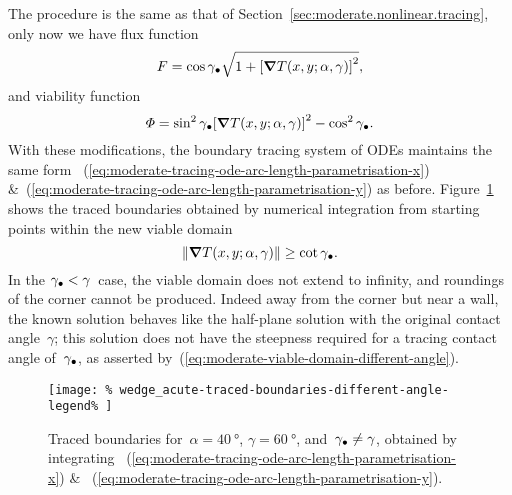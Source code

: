 The procedure is the same
as that of Section~\ref{sec:moderate.nonlinear.tracing},
only now we have flux function
\begin{equation}
  F =
    \cos\gamma_\tr
    \sqrt{1 + \squarebr[\bulkysize]{\del T (x, y; \alpha, \gamma)}^2},
  \label{eq:moderate-flux-function-different-angle}
\end{equation}
and viability function
\begin{equation}
  \Phi =
    \sin^2\gamma_\tr \squarebr[\bulkysize]{\del T (x, y; \alpha, \gamma)}^2
    - \cos^2\gamma_\tr.
    \label{eq:moderate-viability-function-different-angle}
\end{equation}
With these modifications,
the boundary tracing system of ODEs maintains the same form~%
  (\ref{eq:moderate-tracing-ode-arc-length-parametrisation-x})
\&~(\ref{eq:moderate-tracing-ode-arc-length-parametrisation-y})
as before.
Figure~\ref{fig:wedge_acute-traced-boundaries-different-angle}
shows the traced boundaries obtained by numerical integration
from starting points within the new viable domain
\begin{equation}
  \norm[\bulkysize]{\del T (x, y; \alpha, \gamma)} \ge \cot\gamma_\tr.
  \label{eq:moderate-viable-domain-different-angle}
\end{equation}
In the $\gamma_\bullet < \gamma$~case,
the viable domain does not extend to infinity,
and roundings of the corner cannot be produced.
Indeed away from the corner but near a wall,
the known solution behaves like the half-plane solution
with the original contact angle~$\gamma$;
this solution does not have the steepness required
for a tracing contact angle of~$\gamma_\bullet$,
as asserted by~(\ref{eq:moderate-viable-domain-different-angle}).

\begin{figure}
  \newcommand*{\subfigurewidth}{0.4\textwidth}
  \centering
  \texttt{[image: \%
    wedge\_acute-traced-boundaries-different-angle-legend\%
  ]}
  \hspace*{\fill}
  \begin{subfigure}[t]{\subfigurewidth}
  \end{subfigure}
    \hfill
  \begin{subfigure}[t]{\subfigurewidth}
  \end{subfigure}
  \hspace*{\fill}
  \caption{
    Traced boundaries for~$\alpha = \SI{40}{\degree}$,
    $\gamma = \SI{60}{\degree}$, and~$\gamma_\bullet \ne \gamma$,
    obtained by integrating~%
      (\ref{eq:moderate-tracing-ode-arc-length-parametrisation-x})
    \&~%
      (\ref{eq:moderate-tracing-ode-arc-length-parametrisation-y}).
  }
  \label{fig:wedge_acute-traced-boundaries-different-angle}
\end{figure}


